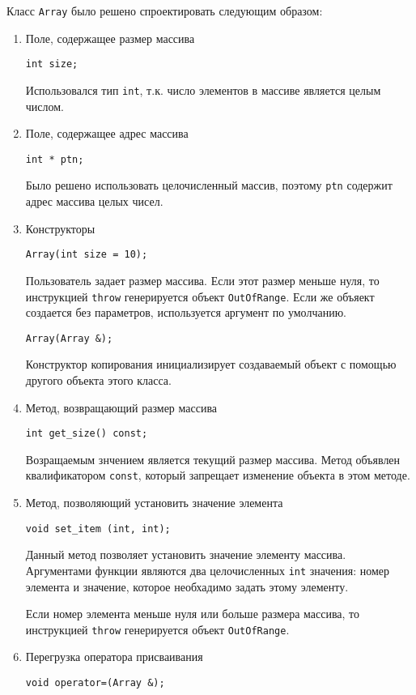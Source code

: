 \documentclass[12pt,a4paper]{report}
\begin{document}
Класс \verb+Array+ было решено спроектировать следующим образом: 
\begin{enumerate}
 	\item Поле, содержащее размер массива
 	
 	\verb+int size;+
 	
	Использовался тип \verb+int+, т.к. число элементов в массиве является целым числом.
		 
	\item Поле, содержащее адрес массива
	
	\verb+int * ptn;+ 
	
	Было решено использовать целочисленный массив, поэтому \verb+ptn+ содержит адрес массива целых чисел.
		 
	\item Конструкторы
	
	\verb+Array(int size = 10);+

	Пользователь задает размер массива. Если этот размер меньше нуля, то инструкцией \verb+throw+ генерируется объект \verb+OutOfRange+. Если же объяект создается без параметров, используется аргумент по умолчанию.
	
	\verb+Array(Array &);+

	Конструктор копирования инициализирует создаваемый объект с помощью другого объекта этого класса.
	
	\item Метод, возвращающий размер массива
	
	\verb+int get_size() const;+
	
	Возращаемым знчением является текущий размер массива. Метод объявлен квалификатором \verb+const+, который запрещает изменение объекта в этом методе.
	
	\item Метод, позволяющий установить значение элемента
	
	\verb+void set_item (int, int);+
	
	Данный метод позволяет установить значение элементу массива. Аргументами функции являются два целочисленных \verb+int+ значения: номер элемента и значение, которое необхадимо задать этому элементу. 
	
	Если номер элемента меньше нуля или больше размера массива, то инструкцией \verb+throw+ генерируется объект \verb+OutOfRange+.
	
	\item Перегрузка оператора присваивания	
	
	\verb+void operator=(Array &);+
	

\end{enumerate}
\end{document}

